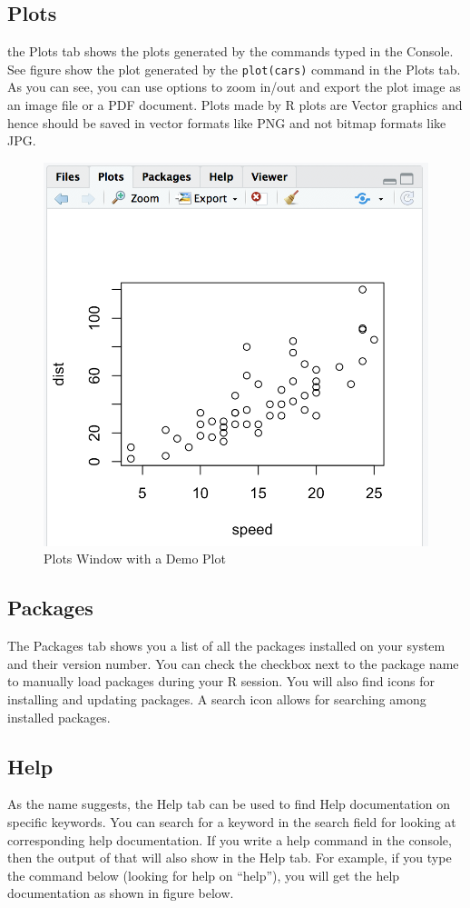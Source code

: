 \documentclass[]{krantz}
\theoremstyle{definition}
\theoremstyle{definition}
\theoremstyle{definition}
\theoremstyle{remark}
\begin{document}
\subsection{Plots}\label{plots}

the Plots tab shows the plots generated by the commands typed in the
Console. See figure show the plot generated by the \texttt{plot(cars)}
command in the Plots tab. As you can see, you can use options to zoom
in/out and export the plot image as an image file or a PDF document.
Plots made by R plots are Vector graphics and hence should be saved in
vector formats like PNG and not bitmap formats like JPG.

\begin{figure}

{\centering \includegraphics[width=0.5\linewidth]{images/plots} 

}

\caption{Plots Window with a Demo Plot}\label{fig:unnamed-chunk-7}
\end{figure}

\subsection{Packages}\label{packages}

The Packages tab shows you a list of all the packages installed on your
system and their version number. You can check the checkbox next to the
package name to manually load packages during your R session. You will
also find icons for installing and updating packages. A search icon
allows for searching among installed packages.

\subsection{Help}\label{help}

As the name suggests, the Help tab can be used to find Help
documentation on specific keywords. You can search for a keyword in the
search field for looking at corresponding help documentation. If you
write a help command in the console, then the output of that will also
show in the Help tab. For example, if you type the command below
(looking for help on ``help''), you will get the help documentation as
shown in figure below.
\end{document}
